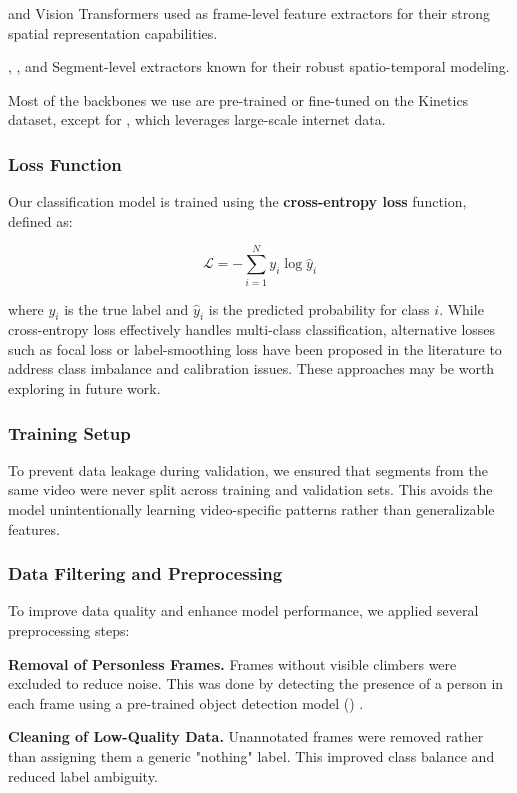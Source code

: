  and  Vision Transformers used as frame-level feature extractors for their strong spatial representation capabilities.

, , and  Segment-level extractors known for their robust spatio-temporal modeling.

Most of the backbones we use are pre-trained or fine-tuned on the Kinetics dataset, except for , which leverages large-scale internet data.

\subsubsection*{Loss Function}
Our classification model is trained using the \textbf{cross-entropy loss} function, defined as:

\[
\mathcal{L} = -\sum_{i=1}^{N} y_i \log \hat{y}_i
\]

where \(y_i\) is the true label and \(\hat{y}_i\) is the predicted probability for class \(i\). While cross-entropy loss effectively handles multi-class classification, alternative losses such as focal loss or label-smoothing loss have been proposed in the literature to address class imbalance and calibration issues. These approaches may be worth exploring in future work.

\subsubsection*{Training Setup}

To prevent data leakage during validation, we ensured that segments from the same video were never split across training and validation sets. This avoids the model unintentionally learning video-specific patterns rather than generalizable features.

\subsubsection*{Data Filtering and Preprocessing}
To improve data quality and enhance model performance, we applied several preprocessing steps:

\noindent\textbf{Removal of Personless Frames.} Frames without visible climbers were excluded to reduce noise. This was done by detecting the presence of a person in each frame using a pre-trained object detection model () \cite{yolo}.

\noindent\textbf{Cleaning of Low-Quality Data.} Unannotated frames were removed rather than assigning them a generic "nothing" label. This improved class balance and reduced label ambiguity.

